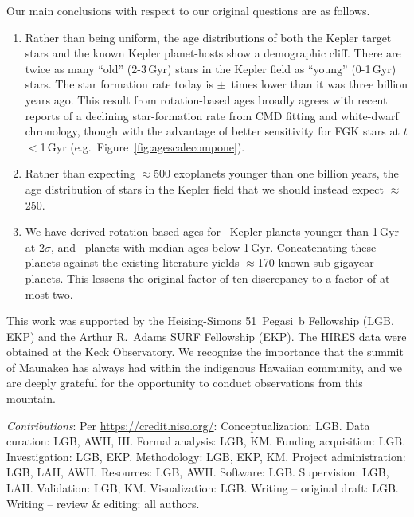 \documentclass[11pt,twocolumn,tighten,linenumbers,trackchanges]{aastex63}
\begin{document}
Our main conclusions with respect to our original questions are as
follows.

\begin{enumerate}[leftmargin=*,topsep=0pt,itemsep=-1ex,partopsep=1ex,parsep=1ex]
  \item Rather than being uniform, the age distributions of both the
    Kepler target stars and the known Kepler planet-hosts show a
    demographic cliff.  There are twice as many ``old'' (2-3\,Gyr)
    stars in the Kepler field as ``young'' (0-1\,Gyr) stars.  The star
    formation rate today is \ratiosfr$\pm$\uncratiosfr\ times lower
    than it was three billion years ago.  This result from
    rotation-based ages broadly agrees with recent reports of a
    declining star-formation rate from CMD fitting and white-dwarf
    chronology, though with the advantage of better sensitivity for
    FGK stars at $t$$<$1\,Gyr (e.g.~Figure~\ref{fig:agescalecompone}).
  \item Rather than expecting $\approx$500 exoplanets younger than one
    billion years, the age distribution of stars in the Kepler field
     that we should instead expect $\approx$250.
  \item We have derived rotation-based ages for \nplyounggyrotwosigma\
    Kepler planets younger than 1\,Gyr at 2$\sigma$, and
    \nplyounggyro\ planets with median ages below 1\,Gyr.
    Concatenating these planets against the existing literature yields
    $\approx$170 known sub-gigayear planets.  This lessens the
    original factor of ten discrepancy to a factor of at most two.
\end{enumerate}


\acknowledgements
This work was supported by the Heising-Simons 51~Pegasi~b Fellowship
(LGB, EKP) and the Arthur R.~Adams SURF Fellowship (EKP).
The HIRES data were obtained at the Keck Observatory.
We recognize the importance that the summit of Maunakea has always had
within the indigenous Hawaiian community, and we are deeply grateful 
for the opportunity to conduct observations from this mountain.



{\it \large Contributions}: Per \url{https://credit.niso.org/}:
Conceptualization: LGB.
Data curation: LGB, AWH, HI.
Formal analysis: LGB, KM.
Funding acquisition: LGB.
Investigation: LGB, EKP.
Methodology: LGB, EKP, KM.
Project administration: LGB, LAH, AWH.
Resources: LGB, AWH.
Software: LGB.
Supervision: LGB, LAH.
Validation: LGB, KM.
Visualization: LGB.
Writing – original draft: LGB.
Writing – review \& editing: all authors.
\end{document}
